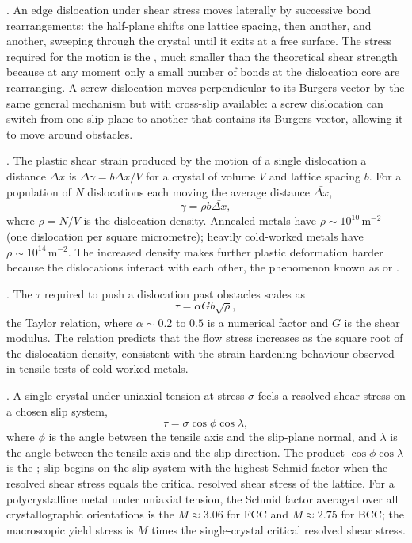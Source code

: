 . An edge dislocation under shear stress
moves laterally by successive bond rearrangements: the half-plane
shifts one lattice spacing, then another, and another, sweeping
through the crystal until it exits at a free surface. The stress
required for the motion is the ,
much smaller than the theoretical shear strength because at any
moment only a small number of bonds at the dislocation core are
rearranging. A screw dislocation moves perpendicular to its Burgers
vector by the same general mechanism but with cross-slip available:
a screw dislocation can switch from one slip plane to another that
contains its Burgers vector, allowing it to move around obstacles.

. The plastic shear
strain produced by the motion of a single dislocation a distance
$\Delta x$ is $\Delta \gamma = b \Delta x / V$ for a crystal of
volume $V$ and lattice spacing $b$. For a population of $N$
dislocations each moving the average distance $\bar{\Delta x}$,
\[
\gamma = \rho b \bar{\Delta x},
\]
where $\rho = N/V$ is the dislocation density. Annealed metals have
$\rho \sim 10^{10}\,\text{m}^{-2}$ (one dislocation per
square micrometre); heavily cold-worked metals have $\rho \sim 10^{14}
\,\text{m}^{-2}$. The increased density makes further plastic
deformation harder because the dislocations interact with each other,
the phenomenon known as  or
.

. The
 $\tau$ required to push a dislocation past
obstacles scales as
\[
\tau = \alpha G b \sqrt{\rho},
\]
the Taylor relation, where $\alpha \sim 0.2$ to $0.5$ is a numerical
factor and $G$ is the shear modulus. The relation predicts that the
flow stress increases as the square root of the dislocation density,
consistent with the strain-hardening behaviour observed in tensile
tests of cold-worked metals.

. A single crystal
under uniaxial tension at stress $\sigma$ feels a resolved shear stress
on a chosen slip system,
\[
\tau = \sigma \cos\phi \cos\lambda,
\]
where $\phi$ is the angle between the tensile axis and the slip-plane
normal, and $\lambda$ is the angle between the tensile axis and the
slip direction. The product $\cos\phi \cos\lambda$ is the
; slip begins on the slip system with the
highest Schmid factor when the resolved shear stress equals the
critical resolved shear stress of the lattice. For a polycrystalline
metal under uniaxial tension, the Schmid factor averaged over all
crystallographic orientations is the  $M \approx
3.06$ for FCC and $M \approx 2.75$ for BCC; the macroscopic yield
stress is $M$ times the single-crystal critical resolved shear stress.

